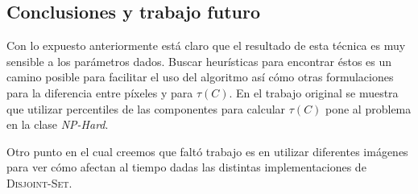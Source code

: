 \subsection{Conclusiones y trabajo futuro}

Con lo expuesto anteriormente está claro que el resultado de esta técnica es
muy sensible a los parámetros dados. Buscar heurísticas para encontrar éstos es
un camino posible para facilitar el uso del algoritmo así cómo otras
formulaciones para la diferencia entre píxeles y para $\tau(C)$. En el trabajo
original se muestra que utilizar percentiles de las componentes para calcular
$\tau(C)$ pone al problema en la clase \emph{NP-Hard}.

Otro punto en el cual creemos que faltó trabajo es en utilizar diferentes
imágenes para ver cómo afectan al tiempo dadas las distintas implementaciones
de \textsc{Disjoint-Set}.
